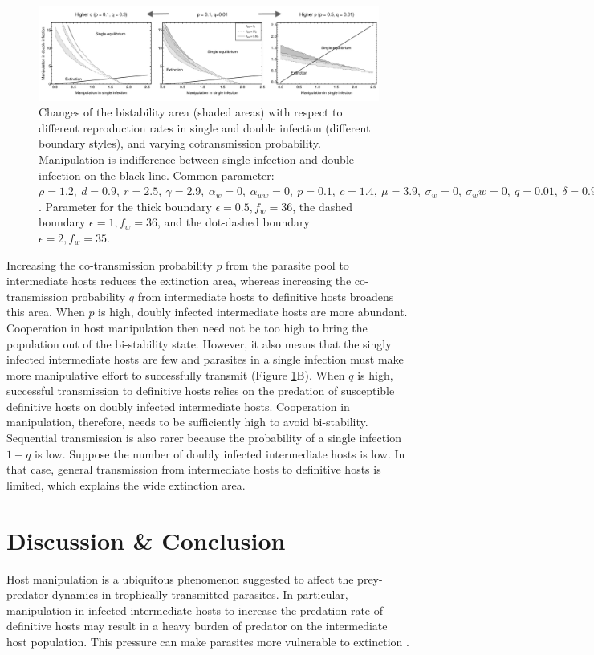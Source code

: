 \documentclass[11pt]{article}
\begin{document}
\begin{figure}[!ht]
\centering
\includegraphics[width=\textwidth]{Figures/manip_bifurcation.pdf}
\caption{Changes of the bistability area (shaded areas) with respect to different reproduction rates in single and double infection (different boundary styles), and varying cotransmission probability. Manipulation is indifference between single infection and double infection on the black line. Common parameter:  $\rho = 1.2, \ d = 0.9, \ r = 2.5, \ \gamma = 2.9, \ \alpha_w = 0, \ \alpha_{ww} = 0, \ p = 0.1, \ c = 1.4, \ \mu = 3.9, \ \sigma_w = 0, \ \sigma_ww = 0, \ q = 0.01, \ \delta = 0.9, \ k = 0.26, \ \epsilon = 0.5$. Parameter for the thick boundary $\epsilon = 0.5, f_w = 36$, the dashed boundary $\epsilon = 1, f_w = 36$, and the dot-dashed boundary $\epsilon = 2, f_w = 35$.}
\label{fig:manipbifur}
\end{figure}

Increasing the co-transmission probability $p$ from the parasite pool to intermediate hosts reduces the extinction area, whereas increasing the co-transmission probability $q$ from intermediate hosts to definitive hosts broadens this area. 
When $p$ is high, doubly infected intermediate hosts are more abundant. Cooperation in host manipulation then need not be too high to bring the population out of the bi-stability state. 
However, it also means that the singly infected intermediate hosts are few and parasites in a single infection must make more manipulative effort to successfully transmit (Figure \ref{fig:manipbifur}B). 
When $q$ is high, successful transmission to definitive hosts relies on the predation of susceptible definitive hosts on doubly infected intermediate hosts. 
Cooperation in manipulation, therefore, needs to be sufficiently high to avoid bi-stability. 
Sequential transmission is also rarer because the probability of a single infection $1-q$ is low. 
Suppose the number of doubly infected intermediate hosts is low. 
In that case, general transmission from intermediate hosts to definitive hosts is limited, which explains the wide extinction area.

\section*{Discussion \& Conclusion}
Host manipulation is a ubiquitous phenomenon suggested to affect the prey-predator dynamics in trophically transmitted parasites. 
In particular, manipulation in infected intermediate hosts to increase the predation rate of definitive hosts may result in a heavy burden of predator on the intermediate host population.
This pressure can make parasites more vulnerable to extinction \citep{Hadeler1989,Fenton2006}. 
\end{document}
